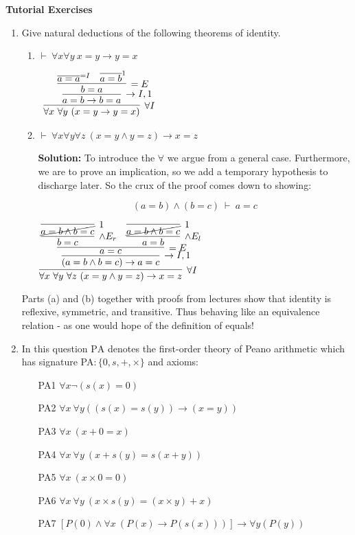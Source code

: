 \documentclass[11pt]{report}
\newcommand{\temp}[2]{{\overline{#2}}^{#1}}
\begin{document}
\newpage
{\bf Tutorial Exercises}
\begin{enumerate}

	\item Give natural deductions of the following theorems of identity.
	
	\begin{enumerate}
		\item $\vdash \ \forall x  \forall y \ x = y \to y = x$
		
		\begin{center}
			$\begin{array}{c}
				\infer[\forall I]{\forall x \ \forall y \ (x = y \to y = x)}
					{\infer[\to I,1]{a=b \to b=a}
						{\infer[=E]{b=a}
							{\temp{=I}{a=a}
							&
							\temp{1}{a=b}}}}
			\end{array}$
		\end{center}


		\item $\vdash \ \forall x \forall y \forall z \ (x = y \land y = z) \to x = z$
		
		{\bf Solution:}	To introduce the $\forall$ we argue from a general case. Furthermore, we are to prove an implication, so we add a temporary hypothesis to discharge later. So the crux of the proof comes down to showing: 

		$$(a=b)\land(b=c) \ \vdash \ a=c$$

			\begin{center}
				$\infer[\forall I]{\forall x \ \forall y \ \forall z \ (x=y \land y=z) \to x = z}
					{\infer[\to I,1]{(a=b \land b=c) \to a=c}
						{\infer[=E]{a = c}
							{\infer[\land E_{r}]{b = c}
							{\infer[1]{\cancel{a=b \land b=c}}
								{}}
							&
							\infer[\land E_{l}]{a = b}
								{\infer[1]{\cancel{a=b \land b=c}}
									{}}}}}$
			\end{center} 
	\end{enumerate}

	Parts (a) and (b) together with proofs from lectures show that identity is reflexive, symmetric, and transitive. Thus behaving like an equivalence relation - as one would hope of the definition of equals!
	
	\newpage
	\item In this question $\text{PA}$ denotes the first-order theory of Peano arithmetic which has signature PA$: \{0,s,+,\times\}$ and axioms:
	
	\begin{enumerate}
		\item[PA1] $\forall x \lnot(s(x) = 0)$
		\item[PA2] $\forall x \ \forall y ((s(x) = s(y)) \to (x = y))$
		\item[PA3] $\forall x \ (x + 0 = x)$
		\item[PA4] $\forall x \ \forall y \ (x + s(y) = s(x + y))$
		\item[PA5] $\forall x \ (x \times 0 = 0)$
		\item[PA6] $\forall x \ \forall y \ (x \times s(y) = (x \times y) + x)$
		\item[PA7] $[P(0) \land \forall x \ (P(x) \to P(s(x)))] \rightarrow \forall y (P(y))$
	\end{enumerate}	
	

\end{enumerate}
\end{document}
